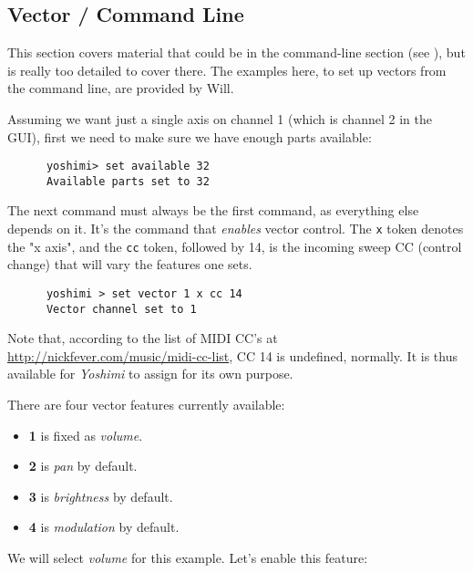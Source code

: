 \subsection{Vector / Command Line}
\label{subsection:vector_command_line}

   This section covers material that could be in the command-line section
   (see ), but is really too detailed to cover
   there.  The examples here, to set up vectors from the command line,
   are provided by Will.

   Assuming we want just a single axis on channel 1 (which is channel
   2 in the GUI), first we need to make sure we have enough parts available:

   \begin{verbatim}
      yoshimi> set available 32
      Available parts set to 32
   \end{verbatim}

   The next command must always be the first command, as everything else depends
   on it. It's the command that \textsl{enables} vector control.  The
   \texttt{x} token denotes the "x axis", and the \texttt{cc} token, followed
   by 14, is the incoming sweep CC (control change) that will vary the
   features one sets.

   \begin{verbatim}
      yoshimi > set vector 1 x cc 14
      Vector channel set to 1
   \end{verbatim}

   Note that, according to the list of MIDI CC's at
   \url{http://nickfever.com/music/midi-cc-list}, CC 14 is undefined,
   normally.  It is thus available for \textsl{Yoshimi} to assign
   for its own purpose.

   There are four vector features currently available:

   \begin{itemize}
      \item \textbf{1} is fixed as \textsl{volume}.
      \item \textbf{2} is \textsl{pan} by default.
      \item \textbf{3} is \textsl{brightness} by default.
      \item \textbf{4} is \textsl{modulation} by default.
   \end{itemize}

   We will select \textsl{volume} for this example.  Let's enable this
   feature:

